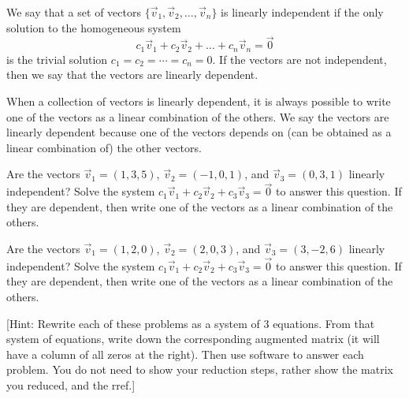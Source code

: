 \begin{definition}
We say that a set of vectors $\{\vec v_1,\vec v_2, \ldots, \vec v_n\}$ is linearly independent if the only solution to the homogeneous system $$c_1\vec v_{1}+c_2\vec v_{2}+\ldots+c_n\vec v_{n}=\vec 0$$ is the trivial solution $c_1=c_2=\cdots=c_n=0$. 
If the vectors are not independent, then we say that the vectors are linearly dependent. 
\end{definition}
When a collection of vectors is linearly dependent, it is always possible to write one of the vectors as a linear combination of the others. We say the vectors are linearly dependent because one of the vectors depends on (can be obtained as a linear combination of) the other vectors.


\begin{problem*}
 Are the vectors $\vec v_1 = (1,3,5)$, $ \vec v_2=(-1,0,1)$, and $\vec v_3=(0,3,1)$ linearly independent?  Solve the system $c_1\vec v_1+c_2\vec v_2+c_3\vec v_3=\vec 0$ to answer this question. If they are dependent, then write one of the vectors as a linear combination of the others.

 Are the vectors $\vec v_1 = (1,2,0)$, $ \vec v_2=(2,0,3)$, and $\vec v_3=(3,-2,6)$ linearly independent?  Solve the system $c_1\vec v_1+c_2\vec v_2+c_3\vec v_3=\vec 0$ to answer this question.  If they are dependent, then write one of the vectors as a linear combination of the others. 

[Hint: Rewrite each of these problems as a system of 3 equations. From that system of equations, write down the corresponding augmented matrix (it will have a column of all zeros at the right).  Then use software to answer each problem.  You do  not need to show your reduction steps, rather show the matrix you reduced, and the rref.]
\end{problem*}

